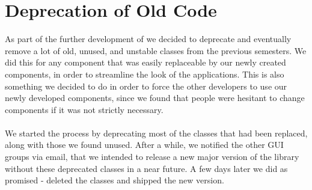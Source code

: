 
\section{Deprecation of Old Code}
\label{sec:deprecation_of_old_code}

As part of the further development of \gc we decided to deprecate and eventually remove a lot of old, unused, and unstable classes from the previous semesters. We did this for any component that was easily replaceable by our newly created components, in order to streamline the look of the applications. This is also something we decided to do in order to force the other developers to use our newly developed components, since we found that people were hesitant to change components if it was not strictly necessary. 
\\\\
We started the process by deprecating most of the classes that had been replaced, along with those we found unused. After a while, we notified the other GUI groups via email, that we intended to release a new major version of the \gc library without these deprecated classes in a near future. A few days later we did as promised - deleted the classes and shipped the new version.
